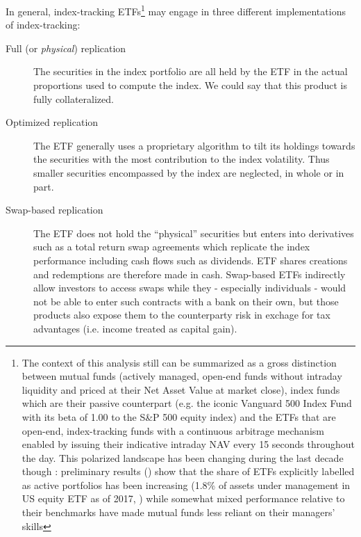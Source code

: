In general, index-tracking ETFs\footnote{The context of this analysis still can be summarized as a gross distinction between mutual funds (actively managed, open-end funds without intraday liquidity and priced at their Net Asset Value at market close), index funds which are their passive counterpart (e.g. the iconic Vanguard 500 Index Fund with its beta of 1.00 to the S\&P 500 equity index) and the ETFs that are open-end, index-tracking funds with a continuous arbitrage mechanism enabled by issuing their indicative intraday NAV every 15 seconds throughout the day. This polarized landscape has been changing during the last decade though : preliminary results (\textcite{Easley2018}) show that the share of ETFs explicitly labelled as active portfolios has been increasing (1.8\% of assets under management in US equity ETF as of 2017, \textcite{Ben-David2017}) while somewhat mixed performance relative to their benchmarks have made mutual funds less reliant on their managers' skills} may engage in three different implementations of index-tracking:
\begin{description}
\item[Full (or \textit{physical}) replication] The securities in the index portfolio are all held by the ETF in the actual proportions used to compute the index. We could say that this product is fully collateralized. 
\item[Optimized replication] The ETF generally uses a proprietary algorithm to tilt its holdings towards the securities with the most contribution to the index volatility. Thus smaller securities encompassed by the index are neglected, in whole or in part.
  \item[Swap-based replication] The ETF does not hold the ``physical'' securities but enters into derivatives such as a total return swap agreements which replicate the index performance including cash flows such as dividends. ETF shares creations and redemptions are therefore made in cash. Swap-based ETFs indirectly allow investors to access swaps while they - especially individuals - would not be able to enter such contracts with a bank on their own, but those products also expose them to the counterparty risk in exchage for tax advantages (i.e. income treated as capital gain). 
\end{description}
